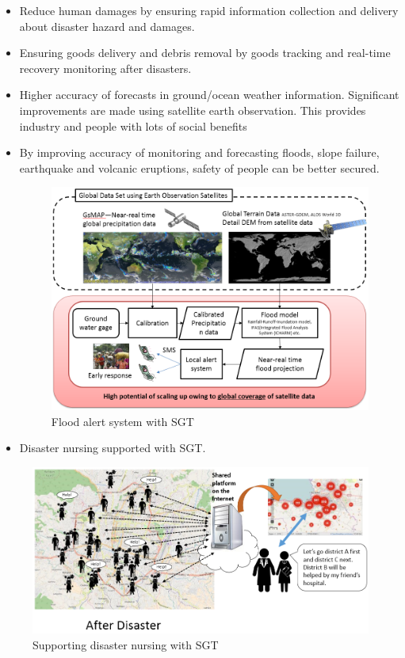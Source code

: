 \begin{itemize}

\item Reduce human damages by ensuring rapid information collection and delivery about disaster hazard and damages.

\item Ensuring goods delivery and debris removal by goods tracking and real-time recovery monitoring after disasters.

\item Higher accuracy of forecasts in ground/ocean weather information. Significant improvements are made using satellite earth observation. This provides industry and people  with lots of social benefits

\item By improving accuracy of monitoring and forecasting floods, slope failure, earthquake and volcanic eruptions, safety of people can be better secured.

\begin{figure}[H]
\begin{center}
\includegraphics[width = 0.8\linewidth]{Figures/flood_alert.png}
\end{center}
\caption{Flood alert system with SGT}
\label{flood_alert}
\end{figure}

\item Disaster nursing supported with SGT.

\end{itemize}

\begin{figure}[H]
\begin{center}
\includegraphics[width = 0.8\linewidth]{Figures/nursing.png}
\end{center}
\caption{Supporting disaster nursing with SGT}
\label{ebola}
\end{figure}

